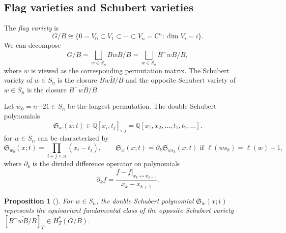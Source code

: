 \documentclass[12pt,reqno]{amsart}
\numberwithin{equation}{section}
\newtheorem{prop}[theorem]{Proposition}
\theoremstyle{definition}
\begin{document}
\subsection{Flag varieties and Schubert varieties}

The \emph{flag variety} is 
$$G/B\cong \{0=V_0\subset V_1\subset \cdots \subset V_n=\mathbb{C}^n:\dim V_i=i\}. $$
We can decompose 
$$G/B=\bigsqcup_{w\in S_n}BwB/B=\bigsqcup_{w\in S_n}B^-wB/B,$$
where $w$ is viewed as the corresponding permutation matrix. 
The Schubert variety of $w\in S_n$ is the closure $\overline{BwB/B}$ and the opposite Schubert variety of $w\in S_n$ is the closure $\overline{B^-wB/B}$. 

Let $w_0=n\cdots 21\in S_n$ be the longest permutation. The double Schubert polynomials $$\mathfrak{S}_w(x;t)\in 
\mathbb{Q}[x_i,t_j]_{i,j}=\mathbb{Q}[x_1,x_2,\ldots,t_1,t_2,\ldots].$$
for $w\in S_n$ can be characterized by 
$$\mathfrak{S}_{w_0}(x;t)=\prod_{i+j\leq n}
(x_i-t_j),\qquad
\mathfrak{S}_w(x;t)
=\partial_k\mathfrak{S}_{ws_k}(x;t)
\text{ if }
\ell(ws_k)=\ell(w)+1,$$
where $\partial_k$ is the divided difference operator on polynomials  
$$\partial_kf =\frac{f-f|_{x_k\leftrightarrow x_{k+1}}}{x_k-x_{k+1}}.$$

\begin{prop}[\cite{AF23}]
For $w\in S_n$, 
the double Schubert polynomial $\mathfrak{S}_w(x;t)$ represents the equivariant fundamental class of the opposite Schubert variety $[\overline{B^-wB/B}]_T\in H_T^*(G/B)$. 
\end{prop}
\end{document}
